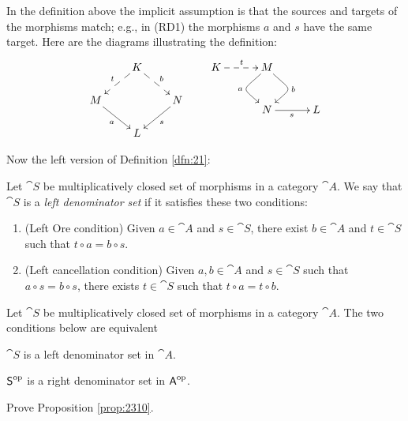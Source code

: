 In the definition above the implicit assumption is that the sources and targets 
of the morphisms match; e.g., in (RD1) the morphisms $a$ and $s$ have the same 
target. Here are the diagrams illustrating the definition: 
\begin{equation} \label{eqn:2310}
\UseTips  \xymatrix @C=5ex @R=4ex  {
& 
K
\ar@{-->}[dl]_{t}
\ar@{-->}[dr]^{b}
\\
M 
\ar[dr]_{a}
& &
N
\ar[dl]^{s}
\\
&
L 
} 
\qquad 
\UseTips  \xymatrix @C=7ex @R=6ex {
K
\ar@{-->}[r]^{t}
&
M
\ar@(dl,ul)[d]_{a}
\ar@(dr,ur)[d]^{b}
\\
&
N
\ar[r]_{s}
&
L
} 
\end{equation}

Now the left version of Definition \ref{dfn:21}:

\begin{dfn} \label{dfn:2311}
Let $\cat{S}$ be multiplicatively closed set of morphisms in a  category 
$\cat{A}$. We say that $\cat{S}$ is a {\em left denominator set}
if it satisfies these two conditions:
\begin{enumerate}[leftmargin=30pt] 
\item[(LD1)] (Left Ore condition) Given $a \in \cat{A}$ and $s \in \cat{S}$,
there exist $b \in \cat{A}$ and $t \in \cat{S}$ such that
$t \circ a = b \circ s$.

\item[(LD2)] (Left cancellation condition) 
Given $a, b \in \cat{A}$ and  $s \in \cat{S}$ such that
$a \circ s = b \circ s$, there exists $t \in \cat{S}$ such that $t \circ a = t 
\circ b$.
\end{enumerate}
\end{dfn}

\begin{prop} \label{prop:2310}
Let $\cat{S}$ be multiplicatively closed set of morphisms in a  category 
$\cat{A}$. The two conditions below are equivalent\tup{:}
\begin{itemize}
 $\cat{S}$ is a left denominator set in $\cat{A}$. 

 $\operatorname{\mathsf{S}}^{\mathrm{op}}$ is a right denominator set in 
$\operatorname{\mathsf{A}}^{\mathrm{op}}$. 
\end{itemize}
\end{prop}

\begin{exer} \label{exer:2312}
Prove Proposition \ref{prop:2310}. 
\end{exer}


